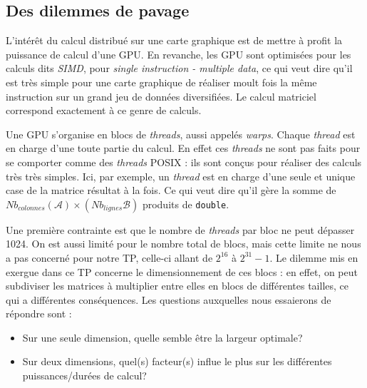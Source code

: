 \documentclass[	DIV=calc,%
							paper=a4,%
							fontsize=11pt%
							]{scrartcl}	 					%
\begin{document}
\subsection*{Des dilemmes de pavage}
L'intérêt du calcul distribué sur une carte graphique est de mettre à profit la puissance de calcul d'une GPU. En revanche, les GPU sont optimisées pour les calculs dits \textit{SIMD}, pour \textit{single instruction - multiple data}, ce qui veut dire qu'il est très simple pour une carte graphique de réaliser moult fois la même instruction sur un grand jeu de données diversifiées. Le calcul matriciel correspond exactement à ce genre de calculs.\par
Une GPU s'organise en blocs de \textit{threads}, aussi appelés \textit{warps}. Chaque \textit{thread} est en charge d'une toute partie du calcul. En effet ces \textit{threads} ne sont pas faits pour se comporter comme des \textit{threads} POSIX : ils sont conçus pour réaliser des calculs très très simples. Ici, par exemple, un \textit{thread} est en charge d'une seule et unique case de la matrice résultat à la fois. Ce qui veut dire qu'il gère la somme de $Nb_{colonnes}(\mathcal{A}) \times (Nb_{lignes}\mathcal{B})$ produits de \texttt{double}.\par
Une première contrainte est que le nombre de \textit{threads} par bloc ne peut dépasser 1024. On est aussi limité pour le nombre total de blocs, mais cette limite ne nous a pas concerné pour notre TP, celle-ci allant de $2^{16}$ à $2^{31} - 1$. Le dilemme mis en exergue dans ce TP concerne le dimensionnement de ces blocs : en effet, on peut subdiviser les matrices à multiplier entre elles en blocs de différentes tailles, ce qui a différentes conséquences. Les questions auxquelles nous essaierons de répondre sont : 
\begin{itemize}
\item Sur une seule dimension, quelle semble être la largeur optimale?
\item Sur deux dimensions, quel(s) facteur(s) influe le plus sur les différentes puissances/durées de calcul?
\end{itemize}
\end{document}
